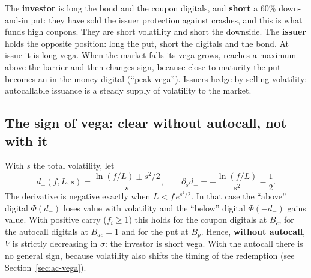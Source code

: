 \begin{idea}[title={Who is long what}]
The \textbf{investor} is long the bond and the coupon digitals, and \textbf{short} a 60\% down-and-in put: they have
sold the issuer protection against crashes, and this is what funds high coupons. They are short volatility and short
the downside. The \textbf{issuer} holds the opposite position: long the put, short the digitals and the bond. At issue
it is long vega. When the market falls its vega grows, reaches a maximum above the barrier and then changes sign,
because close to maturity the put becomes an in-the-money digital (``peak vega''). Issuers hedge by selling
volatility: autocallable issuance is a steady supply of volatility to the market.
\end{idea}

\subsection{The sign of vega: clear without autocall, not with it}
With $s$ the total volatility, let
\[
d_\pm(f,L,s)=\frac{\ln(f/L)\pm s^2/2}{s},\qquad
\partial_sd_-=-\frac{\ln(f/L)}{s^2}-\frac12 .
\]
The derivative is negative exactly when $L<f\,e^{s^2/2}$. In that case the ``above'' digital $\Phi(d_-)$ loses value
with volatility and the ``below'' digital $\Phi(-d_-)$ gains value. With positive carry ($f_i\ge1$) this holds for the
coupon digitals at $B_c$, for the autocall digitals at $B_{ac}=1$ and for the put at $B_p$. Hence, \textbf{without
autocall}, $V$ is strictly decreasing in $\sigma$: the investor is short vega. With the autocall there is no general
sign, because volatility also shifts the timing of the redemption (see Section~\ref{sec:ac-vega}).


